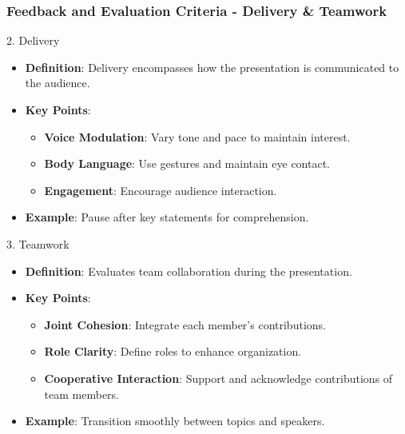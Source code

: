 \documentclass[aspectratio=169]{beamer}
\begin{document}
\begin{frame}[fragile]
    \frametitle{Feedback and Evaluation Criteria - Delivery \& Teamwork}
    \begin{block}{2. Delivery}
        \begin{itemize}
            \item \textbf{Definition}: Delivery encompasses how the presentation is communicated to the audience.
            \item \textbf{Key Points}:
            \begin{itemize}
                \item \textbf{Voice Modulation}: Vary tone and pace to maintain interest.
                \item \textbf{Body Language}: Use gestures and maintain eye contact.
                \item \textbf{Engagement}: Encourage audience interaction.
            \end{itemize}
            \item \textbf{Example}: Pause after key statements for comprehension.
        \end{itemize}
    \end{block}

    \begin{block}{3. Teamwork}
        \begin{itemize}
            \item \textbf{Definition}: Evaluates team collaboration during the presentation.
            \item \textbf{Key Points}:
            \begin{itemize}
                \item \textbf{Joint Cohesion}: Integrate each member's contributions.
                \item \textbf{Role Clarity}: Define roles to enhance organization.
                \item \textbf{Cooperative Interaction}: Support and acknowledge contributions of team members.
            \end{itemize}
            \item \textbf{Example}: Transition smoothly between topics and speakers.
        \end{itemize}
    \end{block}
\end{frame}
\end{document}

